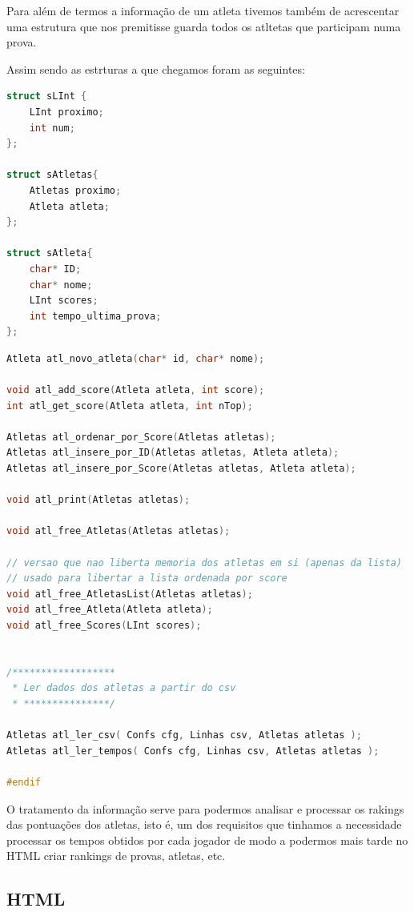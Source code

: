 \documentclass[11pt, a4paper, oneside]{article}
\begin{document}
Para além de termos a informação de um atleta tivemos também de acrescentar uma estrutura que nos premitisse guarda todos os atltetas que participam numa prova.

Assim sendo as estrturas a que chegamos foram as seguintes:

\begin{lstlisting}[language=C, caption={Estrutura de um atleta.}]
struct sLInt {
    LInt proximo;
    int num;
};

struct sAtletas{
    Atletas proximo;
    Atleta atleta;
};

struct sAtleta{
    char* ID;
    char* nome;
    LInt scores;
    int tempo_ultima_prova;
};
\end{lstlisting}

\begin{lstlisting}[language=C, caption={Assinatura das funções.}]
Atleta atl_novo_atleta(char* id, char* nome);

void atl_add_score(Atleta atleta, int score);
int atl_get_score(Atleta atleta, int nTop);

Atletas atl_ordenar_por_Score(Atletas atletas);
Atletas atl_insere_por_ID(Atletas atletas, Atleta atleta);
Atletas atl_insere_por_Score(Atletas atletas, Atleta atleta);

void atl_print(Atletas atletas);

void atl_free_Atletas(Atletas atletas);

// versao que nao liberta memoria dos atletas em si (apenas da lista)
// usado para libertar a lista ordenada por score
void atl_free_AtletasList(Atletas atletas);
void atl_free_Atleta(Atleta atleta);
void atl_free_Scores(LInt scores);


/******************
 * Ler dados dos atletas a partir do csv
 * ***************/

Atletas atl_ler_csv( Confs cfg, Linhas csv, Atletas atletas );
Atletas atl_ler_tempos( Confs cfg, Linhas csv, Atletas atletas );

#endif
\end{lstlisting}

O tratamento da informação serve para podermos analisar e processar os rakings das pontuações dos atletas, isto é, um dos requisitos que tinhamos a necessidade processar os tempos obtidos por cada jogador de modo a podermos mais tarde no HTML criar rankings de provas, atletas, etc.

\newpage
\subsection{HTML}
\end{document}
